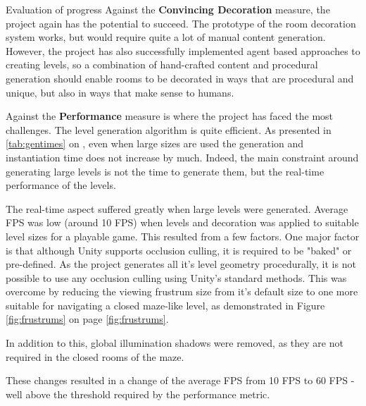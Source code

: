 \documentclass[progress]{cmpreport}
\begin{document}
\begin{section}{Evaluation of progress}
Against the \textbf{Convincing Decoration} measure, the project again has the potential to succeed. The prototype of the room decoration system works, but would require quite a lot of manual content generation. However, the project has also successfully implemented agent based approaches to creating levels, so a combination of hand-crafted content and procedural generation should enable rooms to be decorated in ways that are procedural and unique, but also in ways that make sense to humans.

Against the \textbf{Performance} measure is where the project has faced the most challenges. The level generation algorithm is quite efficient. As presented in \ref{tab:gentimes} on \pageref{tab:gentimes}, even when large sizes are used the generation and instantiation time does not increase by much. Indeed, the main constraint around generating large levels is not the time to generate them, but the real-time performance of the levels.

The real-time aspect suffered greatly when large levels were generated. Average FPS was low (around 10 FPS) when levels and decoration was applied to suitable level sizes for a playable game. This resulted from a few factors. One major factor is that although Unity supports occlusion culling, it is required to be "baked" or pre-defined. As the project generates all it's level geometry procedurally, it is not possible to use any occlusion culling using Unity's standard methods. This was overcome by reducing the viewing frustrum size from it's default size to one more suitable for navigating a closed maze-like level, as demonstrated in Figure \ref{fig:frustrums} on page \ref{fig:frustrums}.

In addition to this, global illumination shadows were removed, as they are not required in the closed rooms of the maze. 

These changes resulted in a change of the average FPS from 10 FPS to 60 FPS - well above the threshold required by the performance metric.

\end{section}



\newpage

\appendix
\end{document}
